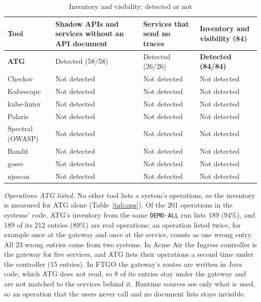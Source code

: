 \documentclass[conference]{IEEEtran}
\begin{document}
\begin{table}[!htbp]
\caption{Inventory and visibility: detected or not}
\label{tab:inventory}
\centering
\scriptsize
\setlength{\tabcolsep}{3pt}
\begin{tabular}{@{}l>{\raggedright\arraybackslash}p{2.3cm}>{\raggedright\arraybackslash}p{1.8cm}>{\raggedright\arraybackslash}p{2.0cm}@{}}
\toprule
Tool & Shadow APIs and services without an API document & Services that send no traces & Inventory and visibility (84) \\
\midrule
\textbf{ATG} & Detected (58/58) & Detected (26/26) & \textbf{Detected (84/84)} \\
Checkov & Not detected & Not detected & Not detected \\
Kubescape & Not detected & Not detected & Not detected \\
kube-linter & Not detected & Not detected & Not detected \\
Polaris & Not detected & Not detected & Not detected \\
Spectral (OWASP) & Not detected & Not detected & Not detected \\
Bandit & Not detected & Not detected & Not detected \\
gosec & Not detected & Not detected & Not detected \\
njsscan & Not detected & Not detected & Not detected \\
\bottomrule
\end{tabular}
\end{table}

\textit{Operations ATG listed.} No other tool lists a system's operations, so the inventory is measured for ATG alone (Table~\ref{tab:ops}). Of the 201 operations in the systems' code, ATG's inventory from the same \texttt{DEMO-ALL} run lists 189 (94\%), and 189 of its 212 entries (89\%) are real operations; an operation listed twice, for example once at the gateway and once at the service, counts as one wrong entry. All 23 wrong entries come from two systems. In Acme Air the Ingress controller is the gateway for five services, and ATG lists their operations a second time under the controller (15 entries). In FTGO the gateway's routes are written in Java code, which ATG does not read, so 8 of its entries stay under the gateway and are not matched to the services behind it. Runtime sources see only what is used, so an operation that the users never call and no document lists stays invisible.
\end{document}
